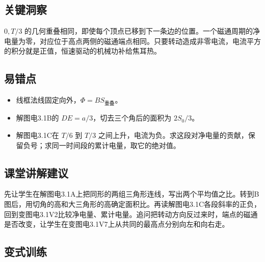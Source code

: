\documentclass[UTF8,fontset=fandol,a4paper,11pt]{ctexart}
\begin{document}


\subsection*{关键洞察}

$0,T/3$ 的几何重叠相同，即使每个顶点已移到下一条边的位置。一个磁通周期的净电量为零，对应位于高点两侧的磁通端点相同。只要转动造成非零电流，电流平方的积分就是正值，恒速驱动的机械功补给焦耳热。



\subsection*{易错点}

\begin{itemize}
\item 线框法线固定向外，$\Phi=BS_{\text{重叠}}$。
\item 解图电3.1B的 $DE=a/3$，切去三个角后的面积为 $2S_0/3$。
\item 解图电3.1C在 $T/6$ 到 $T/3$ 之间上升，电流为负。求这段对净电量的贡献，保留负号；求同一时间段的累计电量，取它的绝对值。
\end{itemize}



\subsection*{课堂讲解建议}

先让学生在解图电3.1A上把同形的两组三角形连线，写出两个平均值之比。转到B图后，用切角的高和大三角形的高确定面积比。再读解图电3.1C各段斜率的正负，回到变图电3.1V2比较净电量、累计电量。追问把转动方向反过来时，端点的磁通是否改变，让学生在变图电3.1V7上从共同的最高点分别向左和向右走。


\subsection*{变式训练}
\end{document}
